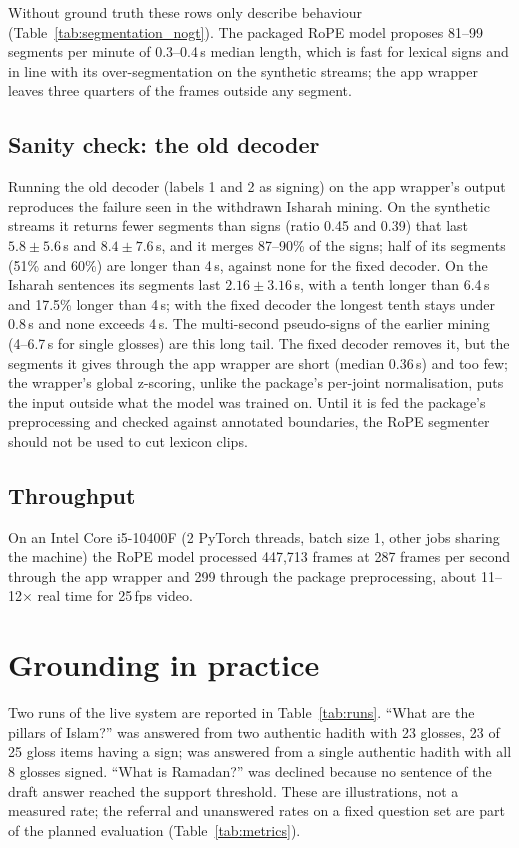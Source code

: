Without ground truth these rows only describe behaviour (Table~\ref{tab:segmentation_nogt}). The packaged RoPE model
proposes 81--99 segments per minute of 0.3--0.4\,s median length, which is fast for lexical signs and in line with its
over-segmentation on the synthetic streams; the app wrapper leaves three quarters of the frames outside any segment.

\subsection{Sanity check: the old decoder}
Running the old decoder (labels 1 and 2 as signing) on the app wrapper's output reproduces the failure seen in the
withdrawn Isharah mining. On the synthetic streams it returns fewer segments than signs (ratio 0.45 and 0.39) that
last $5.8 \pm 5.6$\,s and $8.4 \pm 7.6$\,s, and it merges 87--90\% of the signs; half of its segments
(51\% and 60\%) are longer than 4\,s, against none for the fixed decoder. On the Isharah sentences its segments last
$2.16 \pm 3.16$\,s, with a tenth longer than 6.4\,s and 17.5\% longer than 4\,s; with the fixed decoder the
longest tenth stays under 0.8\,s and none exceeds 4\,s. The multi-second pseudo-signs of the earlier mining (4--6.7\,s
for single glosses) are this long tail. The fixed decoder removes it, but the segments it gives through the app wrapper
are short (median 0.36\,s) and too few; the wrapper's global z-scoring, unlike the package's per-joint
normalisation, puts the input outside what the model was trained on. Until it is fed the package's preprocessing and
checked against annotated boundaries, the RoPE segmenter should not be used to cut lexicon clips.

\subsection{Throughput}
On an Intel Core i5-10400F (2 PyTorch threads, batch size 1, other jobs sharing the machine) the RoPE model processed
447,713 frames at 287 frames per second through the app wrapper and 299 through the package preprocessing, about
11--12$\times$ real time for 25\,fps video.

\section{Grounding in practice}
Two runs of the live system are reported in Table~\ref{tab:runs}. ``What are the pillars of Islam?'' was answered from
two authentic hadith with 23 glosses, 23 of 25 gloss items having a sign;  was answered from a single authentic hadith
with all 8 glosses signed. ``What is Ramadan?'' was declined because no sentence of the draft answer reached
the support threshold. These are illustrations, not a measured rate; the referral and unanswered rates on a fixed
question set are part of the planned evaluation (Table~\ref{tab:metrics}).
